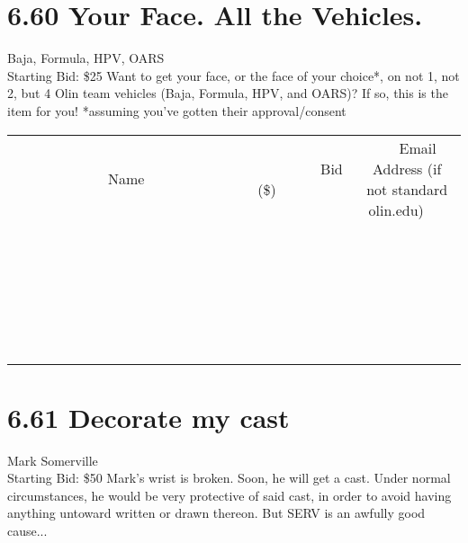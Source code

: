 \documentclass[11pt]{article}
\begin{document}
\section*{6.60 Your Face. All the Vehicles.}
Baja, Formula, HPV, OARS
\\
Starting Bid: \$25
\newline
Want to get your face, or the face of your choice*, on not 1, not 2, but 4 Olin team vehicles (Baja, Formula, HPV, and OARS)? If so, this is the item for you! *assuming you've gotten their approval/consent
\\[6ex]
\begin{tabular}{c c c}
~~~~~~~~~~~~~Name~~~~~~~~~~~~~ & ~~~~~~~~~Bid (\$)~~~~~~~~~  & ~~~Email Address (if not standard olin.edu)~~~\\
 & & \\
\hline
 & & \\
\hline
 & & \\
\hline
 & & \\
\hline
 & & \\
\hline
 & & \\
\hline
 & & \\
\hline
 & & \\
\hline
 & & \\
\hline
 & & \\
\hline
 & & \\
\hline
 & & \\
\hline
 & & \\
\hline
 & & \\
\hline
 & & \\
\hline
 & & \\
\hline
 & & \\
\hline
 & & \\
\hline
 & & \\
\hline
 & & \\
\hline
 & & \\
\hline
 & & \\
\hline
 & & \\
\hline
 & & \\
\hline
 & & \\
\hline
 & & \\
\hline
\end{tabular}
\newpage
\section*{6.61 Decorate my cast}
Mark Somerville
\\
Starting Bid: \$50
\newline
Mark's wrist is broken.  Soon, he will get a cast.  Under normal circumstances, he would be very protective of said cast, in order to avoid having anything untoward written or drawn thereon.  But SERV is an awfully good cause... 
\end{document}
